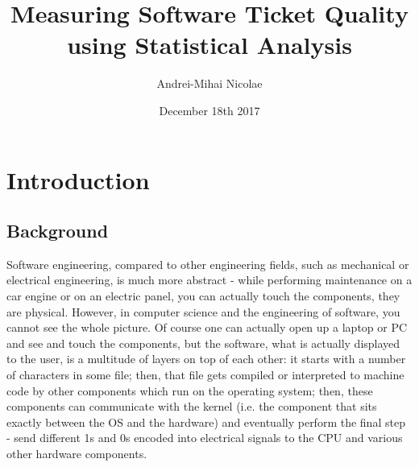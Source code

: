 \documentclass{mprop}
\begin{document}
\title{Measuring Software Ticket Quality using Statistical Analysis}
\author{Andrei-Mihai Nicolae}
\date{December 18th 2017}
\maketitle

\tableofcontents
\newpage


\section{Introduction}\label{intro}

\subsection{Background}

Software engineering, compared to other engineering fields, such as
mechanical or electrical engineering, is much more abstract \citep{brooks1995mythical}- while 
performing maintenance on a car engine or on an electric panel,
you can actually touch the components, they are physical. However, in
computer science and the engineering of software, you cannot see the whole picture.
Of course one can actually open up a laptop or PC and see and touch the
components, but the software, what is actually displayed to the user, 
is a multitude of layers on top of each other: it starts with a number of characters in some file;
then, that file gets compiled or interpreted to machine
code by other components which run on the operating system; then, these components
can communicate with the kernel (i.e. the component that sits exactly
between the OS and the hardware) and eventually perform the final step - send 
different 1s and 0s encoded into electrical signals to the CPU and various
other hardware components.
\end{document}
